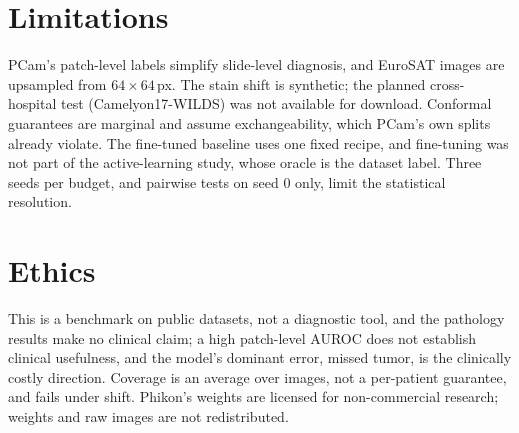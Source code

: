 \documentclass[10pt,twocolumn]{article}
\begin{document}
\section{Limitations}\label{sec:limits}
PCam's patch-level labels simplify slide-level diagnosis, and EuroSAT images are upsampled from
$64\times64$\,px. The stain shift is synthetic; the planned cross-hospital test
(Camelyon17-WILDS) was not available for download. Conformal guarantees are marginal and assume
exchangeability, which PCam's own splits already violate. The fine-tuned baseline uses one
fixed recipe, and fine-tuning was not part of the active-learning study, whose oracle is the
dataset label. Three seeds per budget, and pairwise tests on seed 0 only, limit the statistical
resolution.

\section{Ethics}
This is a benchmark on public datasets, not a diagnostic tool, and the pathology results make
no clinical claim; a high patch-level AUROC does not establish clinical usefulness, and the
model's dominant error, missed tumor, is the clinically costly direction. Coverage is an
average over images, not a per-patient guarantee, and fails under shift. Phikon's weights are
licensed for non-commercial research; weights and raw images are not redistributed.
\end{document}
